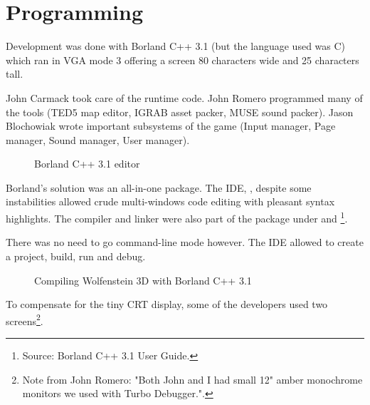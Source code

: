 \documentclass[book.tex]{subfiles}
\begin{document}
\section{Programming}



Development was done with Borland C++ 3.1 (but the language used was C) which ran in VGA mode 3 offering a screen 80 characters wide and 25 characters tall.\\
\par
John Carmack took care of the runtime code. John Romero programmed many of the tools (TED5 map editor, IGRAB asset packer, MUSE sound packer). Jason Blochowiak wrote important subsystems of the game (Input manager, Page manager, Sound manager, User manager).\\

\begin{figure}[H]
\centering
\caption{Borland C++ 3.1 editor}
\end{figure}
\par
Borland's solution was an all-in-one package. The IDE, , despite some instabilities allowed crude multi-windows code editing with pleasant syntax highlights. The compiler and linker were also part of the package under  and \footnote{Source: Borland C++ 3.1 User Guide.}.
\pagebreak


There was no need to go command-line mode however. The IDE allowed to create a project, build, run and debug.\\
\par
\begin{figure}[H]
\centering
  \caption{Compiling Wolfenstein 3D with Borland C++ 3.1}
\end{figure}





To compensate for the tiny CRT display, some of the developers used two screens\footnote{Note from John Romero: "Both John and I had small 12" amber monochrome monitors we used with Turbo Debugger.".}.\\
\end{document}
